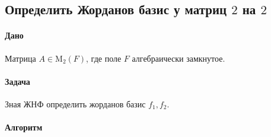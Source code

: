 \documentclass{article}
\newcommand{\Matrix}[2]{\operatorname{\mathrm{M}_{#2}}(#1)}
\begin{document}
\subsection{Определить Жорданов базис у матриц $2$ на $2$}

\paragraph{Дано}

Матрица $A \in \Matrix{F}{2}$, где поле $F$ алгебраически замкнутое.

\paragraph{Задача}

Зная ЖНФ определить жорданов базис $f_1, f_2$.

\paragraph{Алгоритм}
\end{document}
